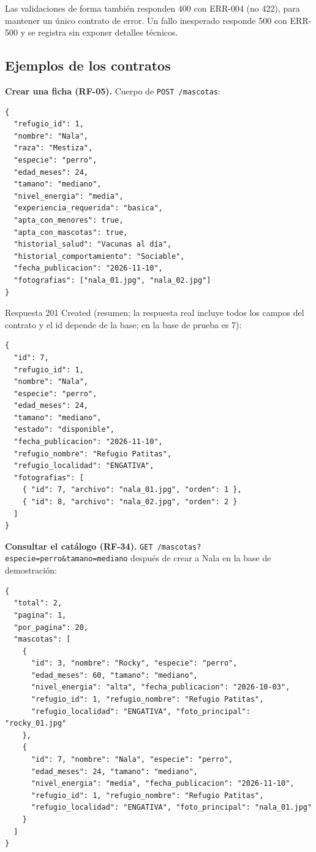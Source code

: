 \documentclass[11pt,a4paper]{article}
\newcommand{\code}[1]{\texttt{#1}}
\begin{document}
Las validaciones de forma también responden 400 con ERR-004 (no 422), para
mantener un único contrato de error. Un fallo inesperado responde 500 con
ERR-500 y se registra sin exponer detalles técnicos.

\subsection{Ejemplos de los contratos}

\textbf{Crear una ficha (RF-05).} Cuerpo de \code{POST /mascotas}:

\begin{lstlisting}
{
  "refugio_id": 1,
  "nombre": "Nala",
  "raza": "Mestiza",
  "especie": "perro",
  "edad_meses": 24,
  "tamano": "mediano",
  "nivel_energia": "media",
  "experiencia_requerida": "basica",
  "apta_con_menores": true,
  "apta_con_mascotas": true,
  "historial_salud": "Vacunas al día",
  "historial_comportamiento": "Sociable",
  "fecha_publicacion": "2026-11-10",
  "fotografias": ["nala_01.jpg", "nala_02.jpg"]
}
\end{lstlisting}

Respuesta 201 Created (resumen; la respuesta real incluye todos los campos del
contrato y el id depende de la base; en la base de prueba es 7):

\begin{lstlisting}
{
  "id": 7,
  "refugio_id": 1,
  "nombre": "Nala",
  "especie": "perro",
  "edad_meses": 24,
  "tamano": "mediano",
  "estado": "disponible",
  "fecha_publicacion": "2026-11-10",
  "refugio_nombre": "Refugio Patitas",
  "refugio_localidad": "ENGATIVA",
  "fotografias": [
    { "id": 7, "archivo": "nala_01.jpg", "orden": 1 },
    { "id": 8, "archivo": "nala_02.jpg", "orden": 2 }
  ]
}
\end{lstlisting}

\textbf{Consultar el catálogo (RF-34).} \code{GET /mascotas?especie=perro\&tamano=mediano}
después de crear a Nala en la base de demostración:

\begin{lstlisting}
{
  "total": 2,
  "pagina": 1,
  "por_pagina": 20,
  "mascotas": [
    {
      "id": 3, "nombre": "Rocky", "especie": "perro",
      "edad_meses": 60, "tamano": "mediano",
      "nivel_energia": "alta", "fecha_publicacion": "2026-10-03",
      "refugio_id": 1, "refugio_nombre": "Refugio Patitas",
      "refugio_localidad": "ENGATIVA", "foto_principal": "rocky_01.jpg"
    },
    {
      "id": 7, "nombre": "Nala", "especie": "perro",
      "edad_meses": 24, "tamano": "mediano",
      "nivel_energia": "media", "fecha_publicacion": "2026-11-10",
      "refugio_id": 1, "refugio_nombre": "Refugio Patitas",
      "refugio_localidad": "ENGATIVA", "foto_principal": "nala_01.jpg"
    }
  ]
}
\end{lstlisting}
\end{document}
